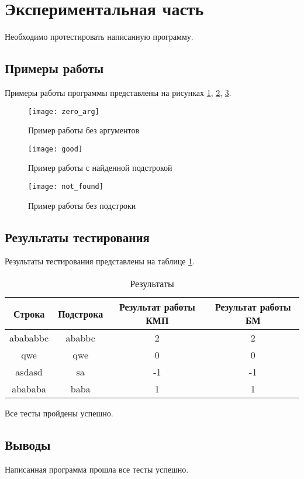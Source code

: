 \newpage
\section{Экспериментальная часть}

Необходимо протестировать написанную программу.

\subsection{Примеры работы}

Примеры работы программы представлены на рисунках
\ref{img:zero_arg}, \ref{img:good}, \ref{img:not_found}.

\begin{figure}[H]
    \centering
    \texttt{[image: zero\_arg]}
    \caption{Пример работы без аргументов}
    \label{img:zero_arg}
\end{figure}

\begin{figure}[H]
    \centering
    \texttt{[image: good]}
    \caption{Пример работы с найденной подстрокой}
    \label{img:good}
\end{figure}

\begin{figure}[H]
    \centering
    \texttt{[image: not\_found]}
    \caption{Пример работы без подстроки}
    \label{img:not_found}
\end{figure}

\subsection{Результаты тестирования}

Результаты тестирования представлены на таблице \ref{table:test_result}.

\begin{table}[H]
    \caption{Результаты}
    \label{table:test_result}
    \centering
    \begin{tabular}{|c|c||c|c|}
        \hline
        Строка & Подстрока & Результат работы КМП & Результат работы БМ \\
        \hline
        \hline
        abababbc & ababbc & 2 & 2\\
        \hline
        qwe & qwe & 0 & 0\\
        \hline
        asdasd & sa & -1 & -1 \\
        \hline
        abababa & baba & 1 & 1 \\
        \hline
    \end{tabular}
\end{table}

Все тесты пройдены успешно.

\subsection{Выводы}

Написанная программа прошла все тесты успешно.

